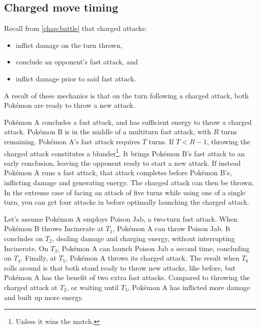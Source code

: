 \subsection{Charged move timing\label{subsec:cmt}}
Recall from \autoref{chap:battle} that charged attacks:
\begin{itemize}
\item inflict damage on the turn thrown,
\item conclude an opponent's fast attack, and
\item inflict damage prior to said fast attack.
\end{itemize}
A result of these mechanics is that on the turn following a charged attack,
 both Pokémon are ready to throw a new attack.

Pokémon A concludes a fast attack, and has sufficient energy to throw a charged attack.
Pokémon B is in the middle of a multiturn fast attack, with $R$ turns remaining.
Pokémon A's fast attack requires $T$ turns.
If $T < R-1$, throwing the charged attack constitutes a blunder\footnote{Unless it wins the match.}.
It brings Pokémon B's fast attack to an early conclusion, leaving the opponent ready to start a new attack.
If instead Pokémon A runs a fast attack, that attack completes before Pokémon B's, inflicting damage and generating energy.
The charged attack can then be thrown.
In the extreme case of facing an attack of five turns while using one of a single turn,
  you can get four attacks in before optimally launching the charged attack.

Let's assume Pokémon A employs Poison Jab, a two-turn fast attack.
When Pokémon B throws Incinerate at $T_1$, Pokémon A can throw Poison Jab.
It concludes on $T_2$, dealing damage and charging energy, without interrupting Incinerate.
On $T_3$, Pokémon A can launch Poison Jab a second time, concluding on $T_4$.
Finally, at $T_5$, Pokémon A throws its charged attack.
The result when $T_6$ rolls around is that both stand ready to throw new attacks, like before,
  but Pokémon A has the benefit of two extra fast attacks.
Compared to throwing the charged attack at $T_2$, or waiting until $T_5$,
  Pokémon A has inflicted more damage and built up more energy.

